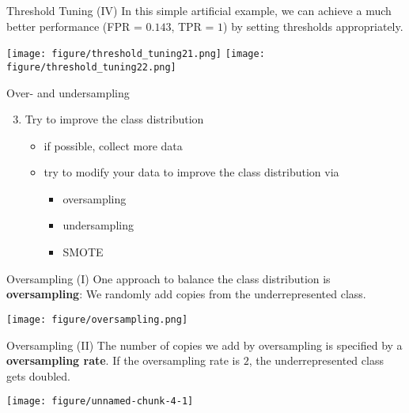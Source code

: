\documentclass[11pt,compress,t,notes=noshow, aspectratio=169, xcolor=table]{beamer}
\begin{document}
\begin{frame}{Threshold Tuning (IV)}
\label{threshold-tuning-iv}
In this simple artificial example, we can achieve a much better
performance (FPR = \(0.143\), TPR = \(1\)) by setting thresholds
appropriately.

\begin{center}
\texttt{[image: figure/threshold\_tuning21.png]}
\texttt{[image: figure/threshold\_tuning22.png]}
\end{center}
\end{frame}

\begin{frame}{Over- and undersampling}
\label{over--and-undersampling}
\begin{enumerate}
\setcounter{enumi}{2}
\tightlist
\item
  Try to improve the class distribution

  \begin{itemize}
  \tightlist
  \item
    if possible, collect more data
  \item
    try to modify your data to improve the class distribution via

    \begin{itemize}
    \tightlist
    \item
      oversampling
    \item
      undersampling
    \item
      SMOTE
    \end{itemize}
  \end{itemize}
\end{enumerate}
\end{frame}

\begin{frame}{Oversampling (I)}
\label{oversampling-i}
One approach to balance the class distribution is \textbf{oversampling}:
We randomly add copies from the underrepresented class.

\begin{center}
\texttt{[image: figure/oversampling.png]}
\end{center}
\end{frame}

\begin{frame}{Oversampling (II)}
\label{oversampling-ii}
The number of copies we add by oversampling is specified by a
\textbf{oversampling rate}. If the oversampling rate is \(2\), the
underrepresented class gets doubled.

\scriptsize

\begin{center}\texttt{[image: figure/unnamed-chunk-4-1]} \end{center}

\normalsize
\end{frame}
\end{document}
